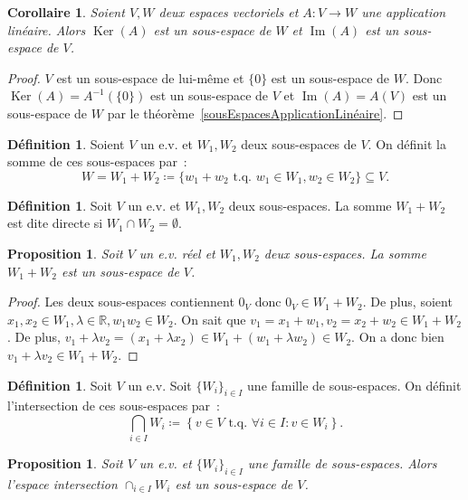 \documentclass{article}
\DeclareMathOperator{\Ker}{Ker}
\DeclareMathOperator{\Imf}{Im}
\newcommand{\R}{\mathbb R}
\newcommand{\tq}{\textrm{ t.q. }}
\newtheorem{prp}[thm]{Proposition}
\newtheorem{cor}[thm]{Corollaire}
\theoremstyle{definition}
\newtheorem{déf}[thm]{Définition}
\theoremstyle{remark}
\begin{document}
		\begin{cor} Soient $V, W$ deux espaces vectoriels et $A : V \to W$ une application linéaire. Alors $\Ker(A)$ est un sous-espace de $W$ et $\Imf(A)$ est un
		sous-espace de $V$. \end{cor}

		\begin{proof} $V$ est un sous-espace de lui-même et $\{0\}$ est un sous-espace de $W$. Donc $\Ker(A) = A^{-1}(\{0\})$ est un sous-espace de $V$ et
		$\Imf(A) = A(V)$ est un sous-espace de $W$ par le théorème~\ref{sousEspacesApplicationLinéaire}.\end{proof}

		\begin{déf} Soient $V$ un e.v. et $W_1, W_2$ deux sous-espaces de $V$. On définit la somme de ces sous-espaces par~:
		\[W = W_1 + W_2 \coloneqq \{w_1 + w_2 \tq w_1 \in W_1, w_2 \in W_2\} \subseteq V.\] \end{déf}

		\begin{déf} Soit $V$ un e.v. et $W_1, W_2$ deux sous-espaces. La somme $W_1 + W_2$ est dite directe si $W_1 \cap W_2 = \emptyset$. \end{déf}

		\begin{prp} Soit $V$ un e.v. réel et $W_1, W_2$ deux sous-espaces. La somme $W_1 + W_2$ est un sous-espace de $V$. \end{prp}

		\begin{proof} Les deux sous-espaces contiennent $0_V$ donc $0_V \in W_1+W_2$. De plus, soient $x_1, x_2 \in W_1, \lambda \in \R, w_1 w_2 \in W_2$. On sait que
		$v_1 = x_1 + w_1, v_2 = x_2 + w_2 \in W_1+W_2$. De plus, $v_1 + \lambda v_2 = (x_1 + \lambda x_2) \in W_1 + (w_1 + \lambda w_2) \in W_2$. On a donc bien
		$v_1 + \lambda v_2 \in W_1 + W_2$. \end{proof}

		\begin{déf} Soit $V$ un e.v. Soit $\{W_i\}_{i \in I}$ une famille de sous-espaces. On définit l'intersection de ces sous-espaces par~:
		\[\bigcap_{i \in I}W_i \coloneqq \left\{v \in V \tq \forall i \in I : v \in W_i\right\}.\]\end{déf}

		\begin{prp} Soit $V$ un e.v. et $\{W_i\}_{i \in I}$ une famille de sous-espaces. Alors l'espace intersection $\cap_{i \in I}W_i$ est un sous-espace de $V$.
		\end{prp}
\end{document}
